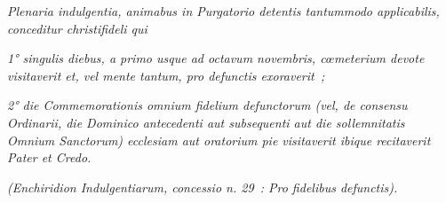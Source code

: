\medskip
\textit{Plenaria indulgentia, animabus in Purgatorio detentis tantummodo applicabilis, conceditur christifideli qui}\par \textit{1° singulis diebus, a primo usque ad octavum novembris, cœmeterium devote visitaverit et, vel mente tantum, pro defunctis exoraverit~;}\par \textit{2° die Commemorationis omnium fidelium defunctorum (vel, de consensu Ordinarii, die Dominico antecedenti aut subsequenti aut die sollemnitatis Omnium Sanctorum) ecclesiam aut oratorium pie visitaverit ibique recitaverit \emph{Pater} et \emph{Credo}.}\begin{flushright}\textit{(Enchiridion Indulgentiarum, concessio n. 29~: Pro fidelibus defunctis).}\end{flushright}

